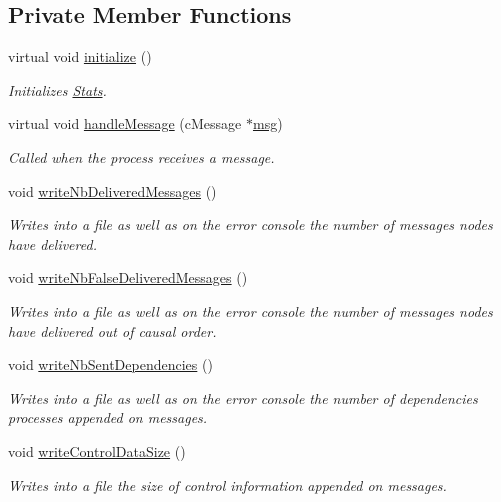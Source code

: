 \subsection*{Private Member Functions}
\begin{DoxyCompactItemize}
\item 
virtual void \hyperlink{class_stats_a650afe7cc5721ec17cfdc94475365f89}{initialize} ()
\begin{DoxyCompactList}\small\item\em Initializes \hyperlink{class_stats}{Stats}. \end{DoxyCompactList}\item 
virtual void \hyperlink{class_stats_adaf8eb884008cdcb1f8a08df41566d16}{handle\+Message} (c\+Message $\ast$\hyperlink{_controller_8h_afa0f3b802fbc219228f7bb97996fa558}{msg})
\begin{DoxyCompactList}\small\item\em Called when the process receives a message. \end{DoxyCompactList}\item 
void \hyperlink{class_stats_afff16579776ca8a5e5dbc4483689c2e4}{write\+Nb\+Delivered\+Messages} ()
\begin{DoxyCompactList}\small\item\em Writes into a file as well as on the error console the number of messages nodes have delivered. \end{DoxyCompactList}\item 
void \hyperlink{class_stats_a45fda4fde87dda93eaa44357d077d48c}{write\+Nb\+False\+Delivered\+Messages} ()
\begin{DoxyCompactList}\small\item\em Writes into a file as well as on the error console the number of messages nodes have delivered out of causal order. \end{DoxyCompactList}\item 
void \hyperlink{class_stats_a5e7dc3debec2bdc35b11e713283ab0b3}{write\+Nb\+Sent\+Dependencies} ()
\begin{DoxyCompactList}\small\item\em Writes into a file as well as on the error console the number of dependencies processes appended on messages. \end{DoxyCompactList}\item 
void \hyperlink{class_stats_a49086baebc806841600c8545b5315149}{write\+Control\+Data\+Size} ()
\begin{DoxyCompactList}\small\item\em Writes into a file the size of control information appended on messages. \end{DoxyCompactList}\item 

\end{DoxyCompactItemize}
